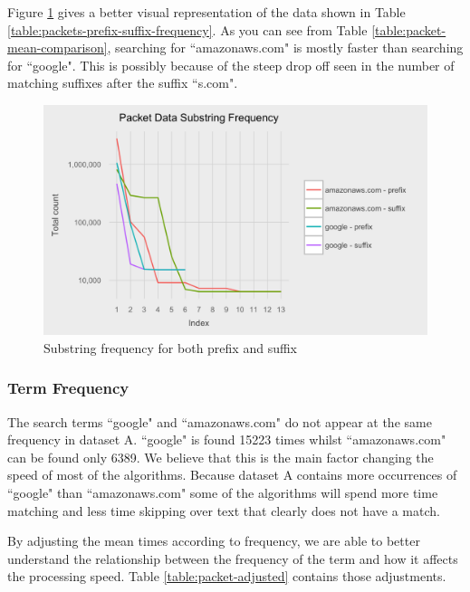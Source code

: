 \documentclass{article}
\begin{document}
Figure \ref{fig:packet-substring-frequency} gives a better visual representation of the data shown in Table \ref{table:packets-prefix-suffix-frequency}. As you can see from Table \ref{table:packet-mean-comparison}, searching for ``amazonaws.com" is mostly faster than searching for ``google". This is possibly because of the steep drop off seen in the number of matching suffixes after the suffix ``s.com".

\begin{figure}[h!bt]
  \centering
  \includegraphics[width=\textwidth]{graphs/substring_frequency.png}
  \caption{Substring frequency for both prefix and suffix}
  \label{fig:packet-substring-frequency}
\end{figure}

\subsubsection{Term Frequency}

The search terms ``google" and ``amazonaws.com" do not appear at the same frequency in dataset A. ``google" is found 15223 times whilst ``amazonaws.com" can be found only 6389. We believe that this is the main factor changing the speed of most of the algorithms. Because dataset A contains more occurrences of ``google" than ``amazonaws.com" some of the algorithms will spend more time matching and less time skipping over text that clearly does not have a match.

By adjusting the mean times according to frequency, we are able to better understand the relationship between the frequency of the term and how it affects the processing speed. Table \ref{table:packet-adjusted} contains those adjustments.
\end{document}
